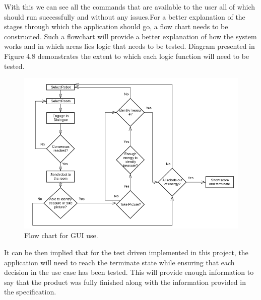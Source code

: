       With this we can see all the commands that are available to the user all of which should run successfully and without any issues.For a better explanation of the stages through which the application should go, a flow chart needs to be constructed. Such a flowchart will provide a better explanation of how the system works and in which areas lies logic that needs to be tested. Diagram presented in Figure 4.8 demonstrates the extent to which each logic function will need to be tested.

        \begin{figure}[!ht]  
          \centering
            \includegraphics[width=1.1\textwidth]{figures/flowChart.png}
            \caption{Flow chart for GUI use.}
        \end{figure}

      It can be then implied that for the test driven implemented in this project, the application will need to reach the terminate state while ensuring that each decision in the use case has been tested. This will provide enough information to say that the product was fully finished along with the information provided in the specification.